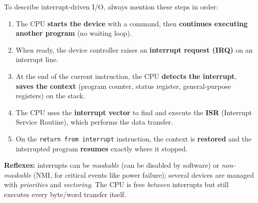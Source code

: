 \documentclass[11pt]{article}
\begin{document}
\begin{methode}
To describe interrupt-driven I/O, always mention these steps in order:
\begin{enumerate}
\item The CPU \textbf{starts the device} with a command, then \textbf{continues executing another program} (no waiting loop).
\item When ready, the device controller raises an \textbf{interrupt request (IRQ)} on an interrupt line.
\item At the end of the current instruction, the CPU \textbf{detects the interrupt}, \textbf{saves the context} (program counter, status register, general-purpose registers) on the stack.
\item The CPU uses the \textbf{interrupt vector} to find and execute the \textbf{ISR} (Interrupt Service Routine), which performs the data transfer.
\item On the \texttt{return from interrupt} instruction, the context is \textbf{restored} and the interrupted program \textbf{resumes} exactly where it stopped.
\end{enumerate}
\textbf{Reflexes:} interrupts can be \emph{maskable} (can be disabled by software) or \emph{non-maskable} (NMI, for critical events like power failure); several devices are managed with \emph{priorities} and \emph{vectoring}. The CPU is free \emph{between} interrupts but still executes every byte/word transfer itself.
\end{methode}
\end{document}

